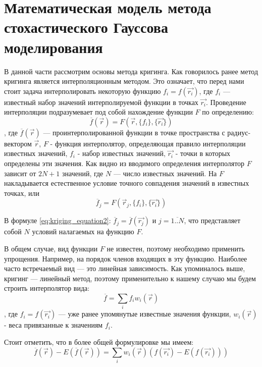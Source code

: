 \section{Математическая модель метода стохастического Гауссова моделирования} \label{sect1_2}
В данной части рассмотрим основы метода кригинга. Как говорилось ранее метод кригинга является интерполяционным методом. Это означает, что перед нами стоит задача интерполировать некоторую функцию $f_i = f(\vec{r_i})$, где $f_i$ — известный набор значений интерполируемой функции в точках $\vec{r_i}$. Проведение интерполяции подразумевает под собой нахождение функции $F$ по определению:
\begin{equation}
  \label{eq:kriging_equation1}
  \overline{f}(\vec{r}) = F(\vec{r}, \{f_i\}, \{\vec{r_i}\}) 
\end{equation}
\noindent
, где $\overline{f}(\vec{r})$ — проинтерполированной функции в точке пространства с радиус-вектором $\vec{r}$, $F$ - функция интерполятор, определяющая правило интерполяции известных значений, ${f_i}$ - набор известных значений, ${\vec{r_i}}$ - точки в которых определены эти значения. Как видно из вводимого определения интерполятор $F$ зависит от $2N + 1$ значений, где $N$ — число известных значений. На $F$ накладывается естественное условие точного совпадения значений в известных точках, или
\begin{equation}
  \label{eq:kriging_equation2}
  \overline{f}_j =  F(\vec{r}_j, \{f_i\}, \{\vec{r_i}\})
\end{equation}

В формуле \eqref{eq:kriging_equation2}: $\overline{f}_j = \overline{f}(\vec{r_j})$ и $j = \overline{1..N}$, что представляет собой $N$ условий налагаемых на функцию $F$.

В общем случае, вид функции $F$ не известен, поэтому необходимо применить упрощения. Например, на порядок членов входящих в эту функцию. Наиболее часто встречаемый вид — это линейная зависимость. Как упоминалось выше, кригинг — линейный метод, поэтому применительно к нашему случаю мы будем строить интерполятор вида:
\begin{equation}
  \label{eq:kriging_equation3}
  \overline{f} =  \sum_{i} f_i w_i(\vec{r})
\end{equation}
\noindent
, где $f_i = f(\vec{r_i})$ — уже ранее упомянутые известные значения функции, $w_i(\vec{r})$ - веса привязанные к значениям $f_i$.

Стоит отметить, что в более общей формулировке мы имеем:
\begin{equation}
  \label{eq:kriging_equation4}
  \overline{f}(\vec{r}) - E(\overline{f}(\vec{r})) =  \sum_{i} w_i(\vec{r}) (f(\vec{r_i}) - E(f(\vec{r_i})))
\end{equation}

